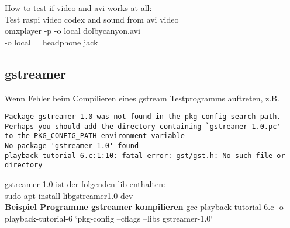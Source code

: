 How to test if video and avi works at all:\\
Test raspi video codex and sound from avi video\\
omxplayer -p -o local dolbycanyon.avi\\
-o local = headphone jack

\subsection{gstreamer}

Wenn Fehler beim Compilieren eines gstream Testprogramms auftreten, z.B.
\begin{verbatim}
Package gstreamer-1.0 was not found in the pkg-config search path.
Perhaps you should add the directory containing `gstreamer-1.0.pc'
to the PKG_CONFIG_PATH environment variable
No package 'gstreamer-1.0' found
playback-tutorial-6.c:1:10: fatal error: gst/gst.h: No such file or directory
\end{verbatim}

gstreamer-1.0 ist der folgenden lib enthalten:\\
sudo apt install libgstreamer1.0-dev\\

\textbf{Beispiel Programme gstreamer kompilieren}
gcc playback-tutorial-6.c -o playback-tutorial-6 `pkg-config --cflags --libs gstreamer-1.0`


